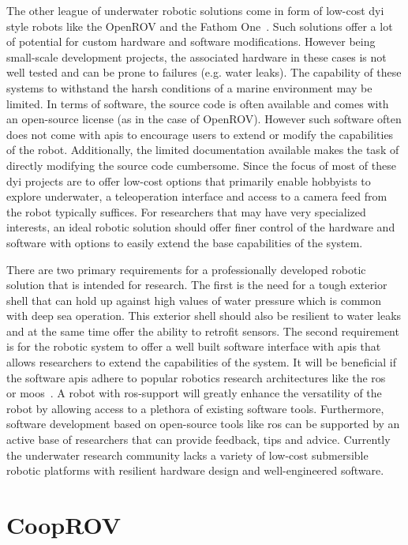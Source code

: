 \documentclass {udthesis}
\begin{document}
The other league of underwater robotic solutions come in form of low-cost \gls{dyi} style robots like the OpenROV \cite{openrov} and the Fathom One~\cite{fathomrov}. Such solutions offer a lot of potential for custom hardware and software modifications. However being small-scale development projects, the associated hardware in these cases is not well tested and can be prone to failures (e.g. water leaks). The capability of these systems to withstand the harsh conditions of a marine environment may be limited. In terms of software, the source code is often available and comes with an open-source license (as in the case of OpenROV). However such software often does not come with \gls{api}s to encourage users to extend or modify the capabilities of the robot. Additionally, the limited documentation available makes the task of directly modifying the source code cumbersome. Since the focus of most of these \gls{dyi} projects are to offer low-cost options that primarily enable hobbyists to explore underwater, a 
teleoperation 
interface and access to a camera feed from the robot typically suffices. For researchers that may have very specialized interests, an ideal robotic solution should offer finer control of the hardware and software with options to easily extend the base capabilities of the system.

There are two primary requirements for a professionally developed robotic solution that is intended for research. The first is the need for a tough exterior shell that can hold up against high values of water pressure which is common with deep sea operation. This exterior shell should also be resilient to water leaks and at the same time offer the ability to retrofit sensors. The second requirement is for the robotic system to offer a well built software interface with \gls{api}s that allows researchers to extend the capabilities of the system. It will be beneficial if the software \gls{api}s adhere to popular robotics research architectures like the \gls{ros}~\cite{ros} or \gls{moos}~\cite{moos}. A robot with \gls{ros}-support will greatly enhance the versatility of the robot by allowing access to a plethora of existing software tools. Furthermore, software development based on open-source tools like \gls{ros} can be supported by an active base of researchers that can provide feedback, 
tips and advice. Currently the underwater research community lacks a variety of low-cost submersible 
robotic platforms with resilient hardware design and well-engineered software.

\section{CoopROV}
\end{document}
